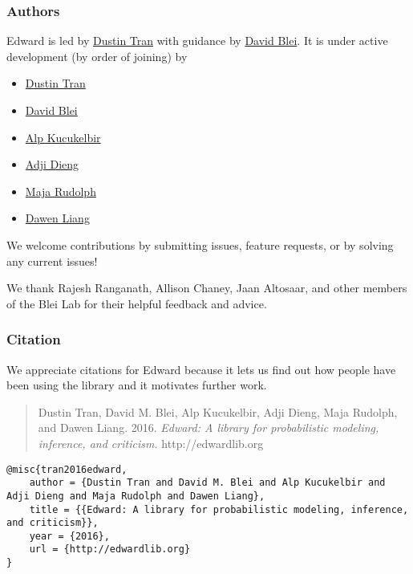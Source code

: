 \subsubsection{Authors}

Edward is led by \href{http://dustintran.com}{Dustin Tran} with guidance
by \href{http://www.cs.columbia.edu/~blei/}{David Blei}. It is under
active development (by order of joining) by
\begin{itemize}
  \item \href{http://dustintran.com}{Dustin Tran} 
  \item \href{http://www.cs.columbia.edu/~blei/}{David Blei} 
  \item \href{http://www.proditus.com/}{Alp Kucukelbir} 
  \item \href{http://stat.columbia.edu/~diengadji/}{Adji Dieng} 
  \item \href{http://maja-rita-rudolph.com/}{Maja Rudolph}
  \item \href{http://www.ee.columbia.edu/~dliang/}{Dawen Liang}
\end{itemize}
We welcome contributions by submitting issues, feature requests, or by solving
any current issues!

We thank Rajesh Ranganath, Allison Chaney, Jaan Altosaar, and other
members of the Blei Lab for their helpful feedback and advice.

\subsubsection{Citation}

We appreciate citations for Edward because it lets us find out how
people have been using the library and it motivates further work.

\begin{quote}
Dustin Tran, David M. Blei, Alp Kucukelbir, Adji Dieng, Maja Rudolph,
and Dawen Liang. 2016. 
\emph{Edward: A library for probabilistic modeling, inference, and criticism. }
http://edwardlib.org
\end{quote}

\begin{lstlisting}[class=JSON]
@misc{tran2016edward,
    author = {Dustin Tran and David M. Blei and Alp Kucukelbir and Adji Dieng and Maja Rudolph and Dawen Liang},
    title = {{Edward: A library for probabilistic modeling, inference, and criticism}},
    year = {2016},
    url = {http://edwardlib.org}
}
\end{lstlisting}
